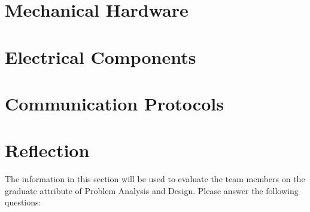 \documentclass[12pt, titlepage]{article}
\begin{document}
\section{Mechanical Hardware}

\section{Electrical Components}

\section{Communication Protocols}

\section{Reflection}

The information in this section will be used to evaluate the team members on the
graduate attribute of Problem Analysis and Design.  Please answer the following questions:
\end{document}
